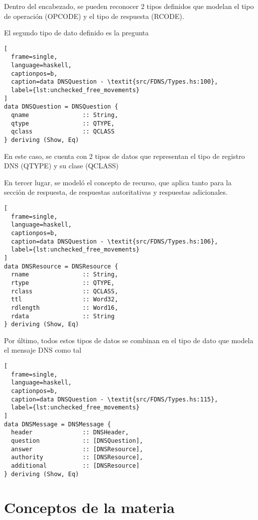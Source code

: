 \documentclass[6pt]{article}
\begin{document}
Dentro del encabezado, se pueden reconocer 2 tipos definidos que modelan el
tipo de operación (OPCODE) y el tipo de respuesta (RCODE).

El segundo tipo de dato definido es la pregunta

\clearpage

\begin{lstlisting}[
  frame=single,
  language=haskell,
  captionpos=b,
  caption=data DNSQuestion - \textit{src/FDNS/Types.hs:100},
  label={lst:unchecked_free_movements}
]
data DNSQuestion = DNSQuestion {
  qname               :: String,
  qtype               :: QTYPE,
  qclass              :: QCLASS
} deriving (Show, Eq)
\end{lstlisting}

En este caso, se cuenta con 2 tipos de datos que representan el tipo de
registro DNS (QTYPE) y su clase (QCLASS)

En tercer lugar, se modeló el concepto de recurso, que aplica tanto
para la sección de respuesta, de respuestas autoritativas y respuestas
adicionales.

\begin{lstlisting}[
  frame=single,
  language=haskell,
  captionpos=b,
  caption=data DNSQuestion - \textit{src/FDNS/Types.hs:106},
  label={lst:unchecked_free_movements}
]
data DNSResource = DNSResource {
  rname               :: String,
  rtype               :: QTYPE,
  rclass              :: QCLASS,
  ttl                 :: Word32,
  rdlength            :: Word16,
  rdata               :: String
} deriving (Show, Eq)
\end{lstlisting}

Por último, todos estos tipos de datos se combinan en el tipo de dato
que modela el mensaje DNS como tal

\begin{lstlisting}[
  frame=single,
  language=haskell,
  captionpos=b,
  caption=data DNSQuestion - \textit{src/FDNS/Types.hs:115},
  label={lst:unchecked_free_movements}
]
data DNSMessage = DNSMessage {
  header              :: DNSHeader,
  question            :: [DNSQuestion],
  answer              :: [DNSResource],
  authority           :: [DNSResource],
  additional          :: [DNSResource]
} deriving (Show, Eq)
\end{lstlisting}

\section{Conceptos de la materia}
\end{document}
